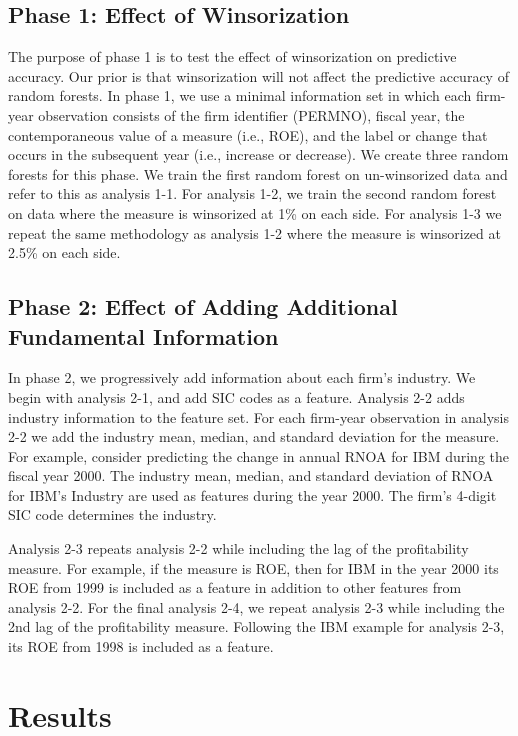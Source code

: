 
\subsection{Phase 1: Effect of Winsorization}

The purpose of phase 1 is to test the effect of winsorization on predictive accuracy.  Our prior is that winsorization will not affect the predictive accuracy of random forests.  In phase 1, we use a minimal information set in which each firm-year observation consists of the firm identifier (PERMNO), fiscal year, the contemporaneous value of a measure (i.e., ROE), and the label or change that occurs in the subsequent year (i.e., increase or decrease). We create three random forests for this phase.  We train the first random forest on un-winsorized data and refer to this as analysis 1-1.  For analysis 1-2, we train the second random forest on data where the measure is winsorized at 1\% on each side. For analysis 1-3 we repeat the same methodology as analysis 1-2 where the measure is winsorized at 2.5\% on each side.

\subsection{Phase 2: Effect of Adding Additional Fundamental Information}
In phase 2, we progressively add information about each firm's industry.  We begin with analysis 2-1, and add SIC codes as a feature.  Analysis 2-2 adds industry information to the feature set.  For each firm-year observation in analysis 2-2 we add the industry mean, median, and standard deviation for the measure. For example, consider predicting the change in annual RNOA for IBM during the fiscal year 2000.  The industry mean, median, and standard deviation of RNOA for IBM's Industry are used as features during the year 2000.  The firm's 4-digit SIC code determines the industry.

Analysis 2-3 repeats analysis 2-2 while including the lag of the profitability measure.  For example, if the measure is ROE, then for IBM in the year 2000 its ROE from 1999 is included as a feature in addition to other features from analysis 2-2.  For the final analysis 2-4,  we repeat analysis 2-3 while including the 2nd lag of the profitability measure.  Following the IBM example for analysis 2-3, its ROE from 1998 is included as a feature.

\section{Results}

